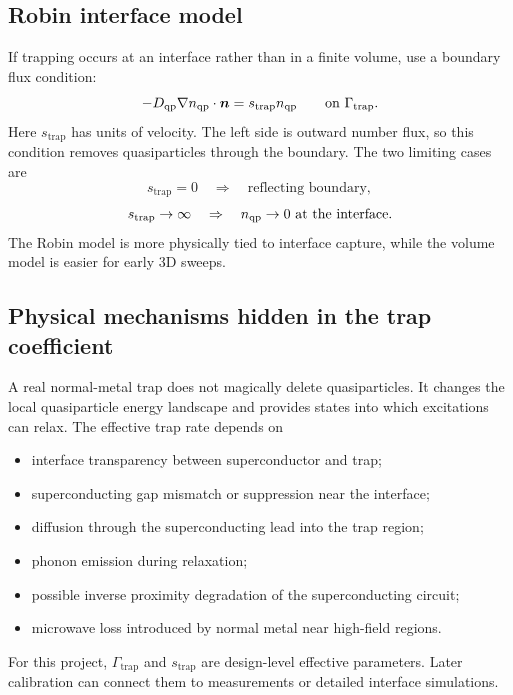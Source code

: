 \documentclass[11pt]{article}
\newcommand{\trap}{\mathrm{trap}}
\begin{document}
\subsection{Robin interface model}
If trapping occurs at an interface rather than in a finite volume, use a boundary flux condition:
\begin{equation}
-D_{\qp}\nabla n_{\qp}\cdot\nvec=s_{\trap}n_{\qp}\qquad \text{on }\Gamma_{\trap}.
\end{equation}
Here $s_{\trap}$ has units of velocity. The left side is outward number flux, so this condition removes quasiparticles through the boundary. The two limiting cases are
\begin{equation}
 s_{\trap}=0 \quad \Rightarrow \quad \text{reflecting boundary},
\end{equation}
\begin{equation}
 s_{\trap}\to\infty \quad \Rightarrow \quad n_{\qp}\to0 \text{ at the interface}.
\end{equation}
The Robin model is more physically tied to interface capture, while the volume model is easier for early 3D sweeps.

\subsection{Physical mechanisms hidden in the trap coefficient}
A real normal-metal trap does not magically delete quasiparticles. It changes the local quasiparticle energy landscape and provides states into which excitations can relax. The effective trap rate depends on
\begin{itemize}[leftmargin=1.6em]
    \item interface transparency between superconductor and trap;
    \item superconducting gap mismatch or suppression near the interface;
    \item diffusion through the superconducting lead into the trap region;
    \item phonon emission during relaxation;
    \item possible inverse proximity degradation of the superconducting circuit;
    \item microwave loss introduced by normal metal near high-field regions.
\end{itemize}
For this project, $\Gamma_{\trap}$ and $s_{\trap}$ are design-level effective parameters. Later calibration can connect them to measurements or detailed interface simulations.
\end{document}
